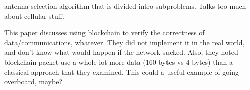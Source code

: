 antenna selection algorithm that is divided intro subproblems. Talks too much about cellular stuff.  \cite{Sheikhzadeh2018}

This paper \cite{Strobel:2018} discusses using blockchain to verify the correctness of data/communications, whatever. They did not implement it in the real world, and don't know what would happen if the network sucked. Also, they noted blockchain packet use a whole lot more data (160 bytes vs 4 bytes) than a classical approach that they examined. This could a useful example of going overboard, maybe?
